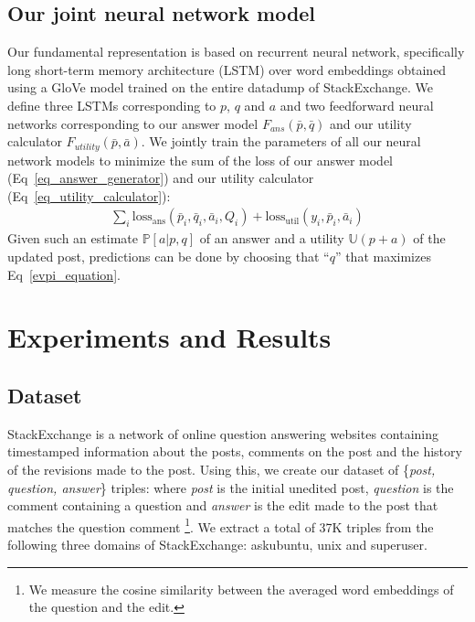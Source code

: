 \documentclass[11pt,a4paper]{article}
\newcommand{\U}{\mathbb{U}}
\begin{document}
\subsection{Our joint neural network model}\label{neural_network}
Our fundamental representation is based on recurrent neural network, specifically long short-term memory architecture (LSTM) \cite{hochreiter1997long} over word embeddings obtained using a GloVe \cite{pennington2014glove} model trained on the entire datadump of StackExchange. We define three LSTMs corresponding to $p$, $q$ and $a$ and two feedforward neural networks corresponding to our answer model $F_{ans}(\bar{p},\bar{q})$ and our utility calculator $F_{utility}(\bar{p}, \bar{a})$. We jointly train the parameters of all our neural network models to minimize the sum of the loss of our answer model (Eq~\ref{eq_answer_generator}) and our utility calculator (Eq~\ref{eq_utility_calculator}):
%
\begin{align}
\sum_i \textrm{loss}_{\textrm{ans}}(\bar p_i, \bar q_i, \bar a_i, Q_i)  
+  \textrm{loss}_{\textrm{util}}(y_i, \bar p_i, \bar a_i)
\end{align}
%
Given such an estimate $\mathbb{P}[a|p,q]$ of an answer and a utility $\U(p+a)$ of the updated post, predictions can be done by choosing that ``$q$'' that maximizes Eq~\ref{evpi_equation}. 

\section{Experiments and Results}

\subsection{Dataset}\label{dataset_creation}
StackExchange is a network of online question answering websites containing timestamped information about the posts, comments on the post and the history of the revisions made to the post. Using this, we create our dataset of \{\textit{post, question, answer}\} triples: where \textit{post} is the initial unedited post, \textit{question} is the comment containing a question and \textit{answer} is the edit made to the post that matches the question comment \footnote{We measure the cosine similarity between the averaged word embeddings of the question and the edit.}. We extract a total of 37K triples from the following three domains of StackExchange: askubuntu, unix and superuser.
\end{document}
